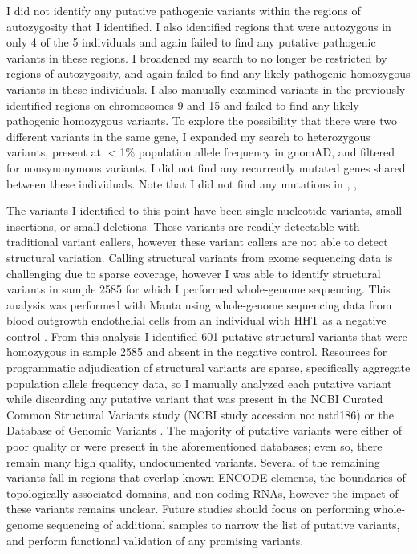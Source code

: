 I did not identify any putative pathogenic variants within the regions of autozygosity that I identified. I also identified regions that were autozygous in only 4 of the 5 individuals and again failed to find any putative pathogenic variants in these regions. I broadened my search to no longer be restricted by regions of autozygosity, and again failed to find any likely pathogenic homozygous variants in these individuals. I also manually examined variants in the previously identified regions on chromosomes 9 and 15 and failed to find any likely pathogenic homozygous variants. To explore the possibility that there were two different variants in the same gene, I expanded my search to heterozygous variants, present at $<$1\% population allele frequency in gnomAD, and filtered for nonsynonymous variants. I did not find any recurrently mutated genes shared between these individuals. Note that I did not find any mutations in , , .

The variants I identified to this point have been single nucleotide variants, small insertions, or small deletions. These variants are readily detectable with traditional variant callers, however these variant callers are not able to detect structural variation. Calling structural variants from exome sequencing data is challenging due to sparse coverage, however I was able to identify structural variants in sample 2585 for which I performed whole-genome sequencing. This analysis was performed with Manta using whole-genome sequencing data from blood outgrowth endothelial cells from an individual with HHT as a negative control \citep{chen2016}. From this analysis I identified 601 putative structural variants that were homozygous in sample 2585 and absent in the negative control. Resources for programmatic adjudication of structural variants are sparse, specifically aggregate population allele frequency data, so I manually analyzed each putative variant while discarding any putative variant that was present in the NCBI Curated Common Structural Variants study (NCBI study accession no: nstd186) or the Database of Genomic Variants \citep{macdonald2014}. The majority of putative variants were either of poor quality or were present in the aforementioned databases; even so, there remain many high quality, undocumented variants. Several of the remaining variants fall in regions that overlap known ENCODE elements, the boundaries of topologically associated domains, and non-coding RNAs, however the impact of these variants remains unclear. Future studies should focus on performing whole-genome sequencing of additional samples to narrow the list of putative variants, and perform functional validation of any promising variants. 



